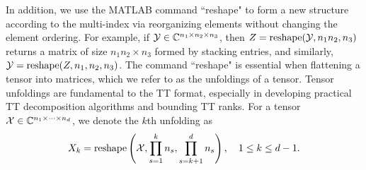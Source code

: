 \documentclass[11pt,a4paper,review]{siamart220329}
\begin{document}
In addition, we use the MATLAB command ``reshape" to form a new structure according to the multi-index via reorganizing elements without changing the element ordering. For example, if $\mathcal{Y} \in \mathbb{C}^{n_1 \times n_2 \times n_3}$, then $Z = {\rm reshape}(\mathcal{Y},n_1n_2,n_3)$ returns a matrix of size $n_1n_2 \times n_3$ formed by stacking entries, and similarly, $\mathcal{Y} = {\rm reshape}(Z,n_1,n_2,n_3)$. The command ``reshape" is essential when flattening a tensor into matrices, which we refer to as the unfoldings of a tensor. Tensor unfoldings are fundamental to the TT format, especially in developing practical TT decomposition algorithms and bounding TT ranks. For a tensor $\mathcal{X}\in\mathbb{C}^{n_1\times\cdots\times n_d}$, we denote the $k$th unfolding as
\[X_k={\rm reshape}\left(\mathcal{X},\prod_{s=1}^k n_s,\prod_{s=k+1}^d n_s\right), \quad 1 \le k \le d-1.\]
\end{document}
